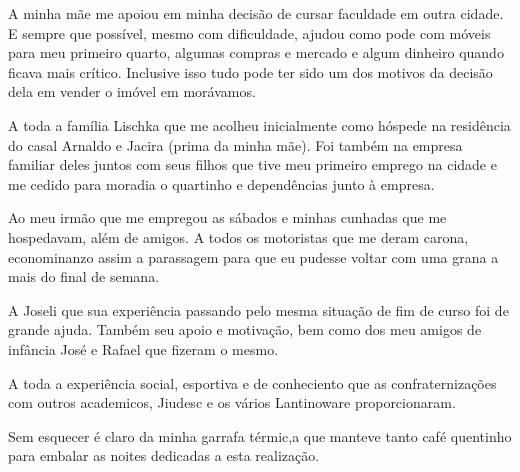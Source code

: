 
A minha mãe me apoiou em minha decisão de cursar faculdade em outra cidade. E
sempre que possível, mesmo com dificuldade, ajudou como pode com móveis para meu
primeiro quarto, algumas compras e mercado e algum dinheiro quando ficava mais
crítico. Inclusive isso tudo pode ter sido um dos motivos da decisão dela em
vender o imóvel em morávamos.

A toda a família Lischka que me acolheu inicialmente como hóspede na residência
do casal Arnaldo e Jacira (prima da minha mãe). Foi também na empresa familiar
deles juntos com seus filhos que tive meu primeiro emprego na cidade e me cedido
para moradia o quartinho e dependências junto à empresa.

Ao meu irmão que me empregou as sábados e minhas cunhadas que me hospedavam, além de amigos. A todos os motoristas que me deram carona, econominanzo assim a parassagem para que eu pudesse voltar com uma grana a mais do final de semana.

A Joseli que sua experiência passando pelo mesma situação de fim de curso foi de grande ajuda. Também seu apoio e motivação, bem como dos meu amigos de infância José e Rafael que fizeram o mesmo.

A toda a experiência social, esportiva e de conheciento que as confraternizações com outros academicos, Jiudesc e os vários Lantinoware proporcionaram.

Sem esquecer é claro da minha garrafa térmic,a que manteve tanto café quentinho para embalar as noites dedicadas a esta realização.
